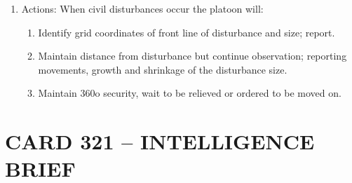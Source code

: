 \documentclass{article}
\begin{document}
\begin{enumerate}
\begin{enumerate}
\begin{enumerate}
\end{enumerate}
\item	Actions: When civil disturbances occur the platoon will:
\begin{enumerate}
    \item	Identify grid coordinates of front line of disturbance and size; report.
\item	Maintain distance from disturbance but continue observation; reporting movements, growth and shrinkage of the disturbance size.
\item	Maintain 360o security, wait to be relieved or ordered to be moved on.
\end{enumerate}
\end{enumerate}
\end{enumerate}

\newpage
\section*{CARD 321 – INTELLIGENCE BRIEF}
\end{document}
